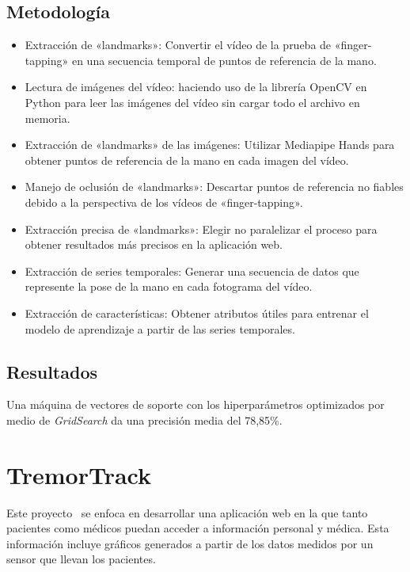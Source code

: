 \subsection{Metodología}
\begin{itemize}


\item Extracción de «landmarks»: Convertir el vídeo de la prueba de «finger-tapping» en una secuencia temporal de puntos de referencia de la mano.

\item Lectura de imágenes del vídeo: haciendo uso de la librería OpenCV en Python para leer las imágenes del vídeo sin cargar todo el archivo en memoria.

\item Extracción de «landmarks» de las imágenes: Utilizar Mediapipe Hands para obtener puntos de referencia de la mano en cada imagen del vídeo.

\item Manejo de oclusión de «landmarks»: Descartar puntos de referencia no fiables debido a la perspectiva de los vídeos de «finger-tapping».

\item Extracción precisa de «landmarks»: Elegir no paralelizar el proceso para obtener resultados más precisos en la aplicación web.

\item Extracción de series temporales: Generar una secuencia de datos que represente la pose de la mano en cada fotograma del vídeo.

\item Extracción de características: Obtener atributos útiles para entrenar el modelo de aprendizaje a partir de las series temporales.


\end{itemize}
\subsection{Resultados}
Una máquina de vectores de soporte con los hiperparámetros optimizados por medio de \textit{GridSearch} da una precisión media del 78,85\%.


\section{TremorTrack}

Este proyecto~\cite{TremorTrack} se enfoca en desarrollar una aplicación web en la que tanto pacientes como médicos puedan acceder a información personal y médica. Esta información incluye gráficos generados a partir de los datos medidos por un sensor que llevan los pacientes.

